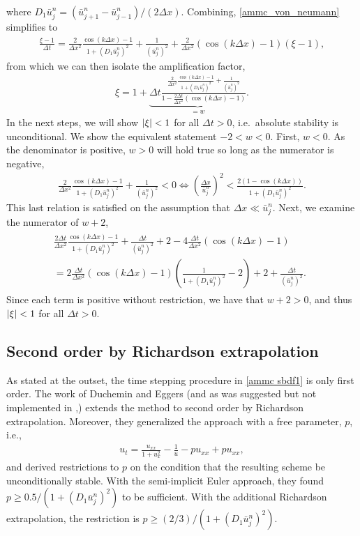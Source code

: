 where $D_1\bar u^n_j = (\bar u^n_{j+1} -  \bar u^n_{j-1})/(2\Delta x)$.
Combining, \eqref{ammc_von_neumann} simplifies to 
\begin{align}
        \frac{\xi - 1}{\Delta t} 
= \frac{2}{\Delta x^2}\frac{\cos(k\Delta x)-1}{1 +(
	D_1\bar u^n_j 
	)^2}
+ \frac{1}{(\bar u_j^n)^2}
+ \frac{2}{\Delta x^2}(\cos(k\Delta x)-1)(\xi-1),
\end{align}
from which we can then isolate the amplification factor,
\begin{align}
        \xi 
= 1+\underbrace{\Delta t \frac{\frac{2}{\Delta x^2}\frac{\cos(k\Delta x)-1}{1 +(
	D_1\bar u^n_j 
	)^2}
+ \frac{1}{(\bar u_j^n)^2}}{1-\frac{2\Delta t}{\Delta x^2}(\cos(k\Delta x)-1)}}_{=w}.
\end{align}
In the next steps, we will show $\left|\xi\right| < 1$ for all $\Delta t > 0$, i.e.\ absolute stability is unconditional. We show the equivalent statement $-2 < w < 0$. First, $w<0$. As the denominator is positive, $w>0$ will hold true so long as the numerator is negative, 
\begin{align}
\frac{2}{\Delta x^2}\frac{\cos(k\Delta x)-1}{1 +(
	D_1\bar u^n_j 
	)^2}
+ \frac{1}{(\bar u_j^n)^2} < 0 
\iff 
\left(\frac{\Delta x}{\bar u^n_j} \right)^2 
< \frac{2(1-\cos(k\Delta x))}{1 + (D_1\bar u^n_j)^2}.
\end{align}
This last relation is satisfied on the assumption that $\Delta x \ll \bar u^n_j$.  Next, we examine the numerator of $w+2$,
\begin{align}
\begin{split}
  \frac{2\Delta t}{\Delta x^2}\frac{\cos(k\Delta x)-1}{1 + (D_1 \bar u^n_j)^2} 
  + \frac{\Delta t}{(\bar u^n_j)^2} + 2 - 4\frac{\Delta t}{\Delta x^2}(\cos(k\Delta x)-1) 
  \phantom{aaaa}
\\
= 2\frac{\Delta t}{\Delta x^2}(\cos(k\Delta x)-1)\left(
\frac{1}{1 + (D_1 \bar u^n_j)^2} - 2 \right)
+ 2 + \frac{\Delta t}{(\bar u^n_j)^2}.
\end{split}
\end{align}
Since each term is positive without restriction, we have that $w+2 > 0$, and thus $\left|\xi\right| < 1$ for all $\Delta t > 0$.

\subsection{Second order by Richardson extrapolation}
As stated at the outset, the time stepping procedure in \eqref{ammc sbdf1} is only first order. The work of Duchemin and Eggers \cite{duchemin2014explicit} (and as was suggested but not implemented in \cite{smereka2003semi},) extends the method to second order by Richardson extrapolation.  Moreover, they generalized the approach with a free parameter, $p$, i.e.,
\begin{align}
u_t = \frac{u_{xx}}{1 + u_x^2} - \frac{1}{u} - pu_{xx} + pu_{xx}, 
\label{ammc p}
\end{align}
and derived restrictions to $p$ on the condition that the resulting scheme be unconditionally stable. With the semi-implicit Euler approach, they found $p \geq0.5/(1 + (D_1 \bar u^n_j)^2)$ to be sufficient. With the additional Richardson extrapolation, the restriction is $p \geq (2/3)/(1 + (D_1 \bar u^n_j)^2)$.

